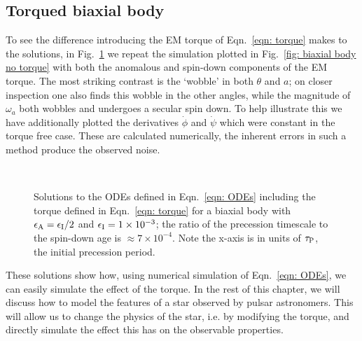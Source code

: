 \documentclass[../full_thesis/full_thesis.tex]{subfiles}
\begin{document}
\subsection{Torqued biaxial body}
\label{sec: biaxial body with torque}
To see the difference introducing the EM torque of Eqn.~\eqref{eqn: torque}  makes to the
solutions, in Fig.~\ref{fig: biaxial body with torque} we repeat the simulation
plotted in Fig.~\ref{fig: biaxial body no torque} with both the anomalous
and spin-down components of the EM torque. The most
striking contrast is the `wobble' in both $\theta$ and $a$; on closer
inspection one also finds this wobble in the other angles, while the magnitude of
$\omega_a$ both wobbles and undergoes a secular spin down. To help illustrate
this we have additionally plotted the derivatives $\dot{\phi}$ and $\dot{\psi}$
which were constant in the torque free case. These are calculated numerically,
the inherent errors in such a method produce the observed noise.
\afterpage{\clearpage}
\begin{figure}[p]
    \centering
{} \\
\caption{Solutions to the ODEs defined in Eqn.~\eqref{eqn: ODEs} including the
torque defined in Eqn.~\eqref{eqn: torque} for a biaxial body with
$\epsilon_{\mathrm{A}}=\epsilon_{\mathrm{I}}/2$ and $\epsilon_{\mathrm{I}}=1\times10^{-3}$; the ratio of the precession timescale
to the spin-down age is $\approx 7\times10^{-4}$. Note the x-axis is in units of
$\tau_{\mathrm{P}}$, the initial precession period.}
\label{fig: biaxial body with torque}
\end{figure}

These solutions show how, using numerical simulation of Eqn.~\eqref{eqn: ODEs},
we can easily simulate the effect of the \citet{Deutsch1955} torque. In the rest
of this chapter, we will discuss how to model the features of a star observed
by pulsar astronomers. This will allow us to change the physics of the star,
i.e. by modifying the torque, and directly simulate the effect this has on
the observable properties.
\end{document}

